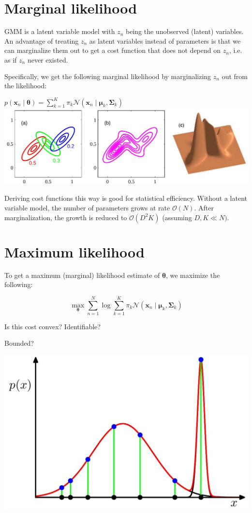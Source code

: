 \documentclass[10pt]{article}
\begin{document}
\section*{Marginal likelihood}
GMM is a latent variable model with $z_{n}$ being the unobserved (latent) variables. An advantage of treating $z_{n}$ as latent variables instead of parameters is that we can marginalize them out to get a cost function that does not depend on $z_{n}$, i.e. as if $z_{n}$ never existed.

Specifically, we get the following marginal likelihood by marginalizing $z_{n}$ out from the likelihood:

$p\left(\mathbf{x}_{n} \mid \boldsymbol{\theta}\right)=\sum_{k=1}^{K} \pi_{k} \mathcal{N}\left(\mathbf{x}_{n} \mid \boldsymbol{\mu}_{k}, \boldsymbol{\Sigma}_{k}\right)$
\includegraphics[max width=\textwidth, center]{2023_12_30_0ee90ffe1a149a681222g-4}

Deriving cost functions this way is good for statistical efficiency. Without a latent variable model, the number of parameters grows at rate $\mathcal{O}(N)$. After marginalization, the growth is reduced to $\mathcal{O}\left(D^{2} K\right)$ (assuming $D, K \ll N)$.

\section*{Maximum likelihood}
To get a maximum (marginal) likelihood estimate of $\boldsymbol{\theta}$, we maximize the following:

$$
\max _{\boldsymbol{\theta}} \sum_{n=1}^{N} \log \sum_{k=1}^{K} \pi_{k} \mathcal{N}\left(\mathbf{x}_{n} \mid \boldsymbol{\mu}_{k}, \boldsymbol{\Sigma}_{k}\right)
$$

Is this cost convex? Identifiable?

Bounded?

\begin{center}
\includegraphics[max width=\textwidth]{2023_12_30_0ee90ffe1a149a681222g-5}
\end{center}
\end{document}
